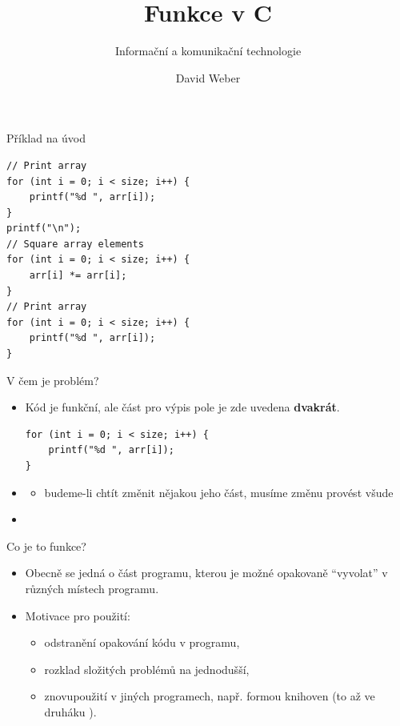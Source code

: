 \documentclass[14pt,aspectratio=169]{beamer}
\title{Funkce v C}
\subtitle{Informační a komunikační technologie}
\author{David Weber}
\begin{document}

    \begin{frame}
        \titlepage
    \end{frame}

    \begin{frame}[t,fragile]{Příklad na úvod}
        \begin{lstlisting}
// Print array
for (int i = 0; i < size; i++) {
    printf("%d ", arr[i]);
}
printf("\n");
// Square array elements
for (int i = 0; i < size; i++) {
    arr[i] *= arr[i];
}
// Print array
for (int i = 0; i < size; i++) {
    printf("%d ", arr[i]);
}
        \end{lstlisting}
    \end{frame}

    \begin{frame}[t,fragile]{V čem je problém?}
        \begin{itemize}
            \item Kód je funkční, ale část pro výpis pole je zde uvedena \textbf{dvakrát}.
            \begin{lstlisting}
for (int i = 0; i < size; i++) {
    printf("%d ", arr[i]);
}
            \end{lstlisting}
            \item {} \xmark
            \begin{itemize}
                \item budeme-li chtít změnit nějakou jeho část, musíme změnu provést všude
            \end{itemize}
            \item {} \cmark
        \end{itemize}
    \end{frame}

    \begin{frame}[t]{Co je to funkce?}
        \begin{itemize}
            \item Obecně se jedná o část programu, kterou je možné opakovaně ``vyvolat'' v různých místech programu.
            \item Motivace pro použití:
            \begin{itemize}
                \item odstranění opakování kódu v programu,
                \item rozklad složitých problémů na jednodušší,
                \item znovupoužití v jiných programech, např. formou knihoven (to až ve druháku ).
            \end{itemize}
        \end{itemize}
    \end{frame}
\end{document}
